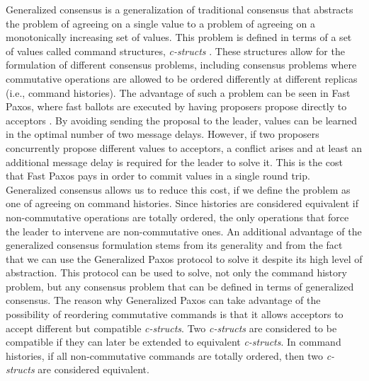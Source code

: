 \documentclass[runningheads,a4paper]{llncs}
\begin{document}
Generalized consensus is a generalization of traditional consensus that abstracts the problem of agreeing on a single value to a problem of agreeing on a monotonically increasing set of values. This problem is defined in terms of a set of values called command structures, \textit{c-structs} \cite{Lamport2005}. These structures allow for the formulation of different consensus problems, including consensus problems where commutative operations are allowed to be ordered differently at different replicas (i.e., command histories). The advantage of such a problem can be seen in Fast Paxos, where fast ballots are executed by having proposers propose directly to acceptors \cite{Lamport2006}. By avoiding sending the proposal to the leader, values can be learned in the optimal number of two message delays. However, if two proposers concurrently propose different values to acceptors, a conflict arises and at least an additional message delay is required for the leader to solve it. This is the cost that Fast Paxos pays in order to commit values in a single round trip.  Generalized consensus allows us to reduce this cost, if we define the problem as one of agreeing on command histories. Since histories are considered equivalent if non-commutative operations are totally ordered, the only operations that force the leader to intervene are non-commutative ones. An additional advantage of the generalized consensus formulation stems from its generality and from the fact that we can use the Generalized Paxos protocol to solve it despite its high level of abstraction. This protocol can be used to solve, not only the command history problem, but any consensus problem that can be defined in terms of generalized consensus. The reason why Generalized Paxos can take advantage of the possibility of reordering commutative commands is that it allows acceptors to accept different but compatible \textit{c-structs}. Two \textit{c-structs} are considered to be compatible if they can later be extended to equivalent \textit{c-structs}. In command histories, if all non-commutative commands are totally ordered, then two \textit{c-structs} are considered equivalent. \par
\end{document}
